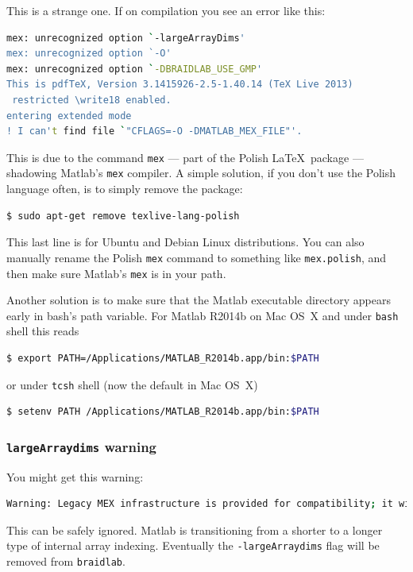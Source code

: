 \documentclass[12pt]{article}
\newcommand{\braidlab}{\texttt{braidlab}}%
\begin{document}
%
This is a strange one.  If on compilation you see an error like this:
\begin{lstlisting}[frame=single,framerule=0pt,escapechar=*,%
  language=bash,backgroundcolor=\color{white}]
mex: unrecognized option `-largeArrayDims'
mex: unrecognized option `-O'
mex: unrecognized option `-DBRAIDLAB_USE_GMP'
This is pdfTeX, Version 3.1415926-2.5-1.40.14 (TeX Live 2013)
 restricted \write18 enabled.
entering extended mode
! I can't find file `"CFLAGS=-O -DMATLAB_MEX_FILE"'.
\end{lstlisting}
This is due to the command \lstinline{mex} --- part of the Polish \LaTeX\
package --- shadowing Matlab's \lstinline{mex} compiler.  A simple solution,
if you don't use the Polish language often, is to simply remove the package:
\begin{lstlisting}[frame=single,framerule=0pt,escapechar=*,%
  language=bash,backgroundcolor=\color{white}]
$ sudo apt-get remove texlive-lang-polish
\end{lstlisting}
This last line is for Ubuntu and Debian Linux distributions.  You can also
manually rename the Polish \lstinline{mex} command to something like
\lstinline{mex.polish}, and then make sure Matlab's \lstinline{mex} is in your
path.

Another solution is to make sure that the Matlab executable directory appears
early in bash's path variable. For Matlab R2014b on Mac OS~X %
% 
and under \lstinline{bash} shell this reads
\begin{lstlisting}[frame=single,framerule=0pt,escapechar=*,%
  language=bash,backgroundcolor=\color{white}]
$ export PATH=/Applications/MATLAB_R2014b.app/bin:$PATH
\end{lstlisting}
or under \lstinline{tcsh} shell (now the default in Mac OS~X) 
\begin{lstlisting}[frame=single,framerule=0pt,escapechar=*,%
  language=bash,backgroundcolor=\color{white}]
$ setenv PATH /Applications/MATLAB_R2014b.app/bin:$PATH
\end{lstlisting}

%

\subsubsection{\lstinline{largeArraydims} warning}

You might get this warning:
\begin{lstlisting}[frame=single,framerule=0pt,escapechar=*,%
  language=bash,backgroundcolor=\color{white}]
Warning: Legacy MEX infrastructure is provided for compatibility; it will be removed in a future version of MATLAB.
\end{lstlisting}
This can be safely ignored.  Matlab is transitioning from a shorter to a
longer type of internal array indexing.  Eventually the
\lstinline{-largeArraydims} flag will be removed from \braidlab.
\end{document}
